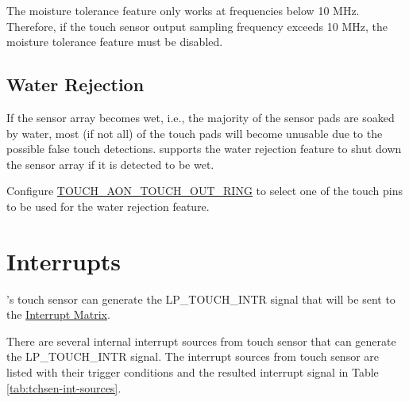 \documentclass[main\_\_EN.tex]{subfiles}
\begin{document}
\begin{tiplisting}
The moisture tolerance feature only works at frequencies below 10 MHz. Therefore, if the touch sensor output sampling frequency exceeds 10 MHz, the moisture tolerance feature must be disabled.
\end{tiplisting}

\subsection{Water Rejection}
\label{sec:tchsen-water-reject}

If the sensor array becomes wet, i.e., the majority of the sensor pads are soaked by water, most (if not all) of the touch pads will become unusable due to the possible false touch detections. \chipname{} supports the water rejection feature to shut down the sensor array if it is detected to be wet.

Configure \hyperref[fielddesc:TOUCHAONTOUCHOUTRING]{TOUCH\_AON\_TOUCH\_OUT\_RING} to select one of the touch pins to be used for the water rejection feature.



\section{Interrupts}

\chipname{}'s touch sensor can generate the LP\_TOUCH\_INTR signal that will be sent to the \hyperref[mod:intmtrx]{Interrupt Matrix}.

There are several internal interrupt sources from touch sensor that can generate the LP\_TOUCH\_INTR signal. The interrupt sources from touch sensor are listed with their trigger conditions and the resulted interrupt signal in Table \ref{tab:tchsen-int-sources}.
\end{document}
